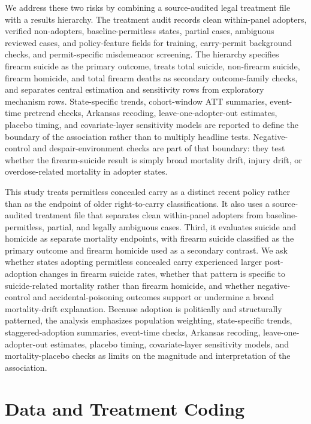 \documentclass[11pt]{article}
\begin{document}
We address these two risks by combining a source-audited legal treatment file with a results hierarchy. The treatment audit records clean within-panel adopters, verified non-adopters, baseline-permitless states, partial cases, ambiguous reviewed cases, and policy-feature fields for training, carry-permit background checks, and permit-specific misdemeanor screening. The hierarchy specifies firearm suicide as the primary outcome, treats total suicide, non-firearm suicide, firearm homicide, and total firearm deaths as secondary outcome-family checks, and separates central estimation and sensitivity rows from exploratory mechanism rows. State-specific trends, cohort-window ATT summaries, event-time pretrend checks, Arkansas recoding, leave-one-adopter-out estimates, placebo timing, and covariate-layer sensitivity models are reported to define the boundary of the association rather than to multiply headline tests. Negative-control and despair-environment checks are part of that boundary: they test whether the firearm-suicide result is simply broad mortality drift, injury drift, or overdose-related mortality in adopter states.

This study treats permitless concealed carry as a distinct recent policy rather than as the endpoint of older right-to-carry classifications. It also uses a source-audited treatment file that separates clean within-panel adopters from baseline-permitless, partial, and legally ambiguous cases. Third, it evaluates suicide and homicide as separate mortality endpoints, with firearm suicide classified as the primary outcome and firearm homicide used as a secondary contrast. We ask whether states adopting permitless concealed carry experienced larger post-adoption changes in firearm suicide rates, whether that pattern is specific to suicide-related mortality rather than firearm homicide, and whether negative-control and accidental-poisoning outcomes support or undermine a broad mortality-drift explanation. Because adoption is politically and structurally patterned, the analysis emphasizes population weighting, state-specific trends, staggered-adoption summaries, event-time checks, Arkansas recoding, leave-one-adopter-out estimates, placebo timing, covariate-layer sensitivity models, and mortality-placebo checks as limits on the magnitude and interpretation of the association.

\section*{Data and Treatment Coding}
\end{document}
